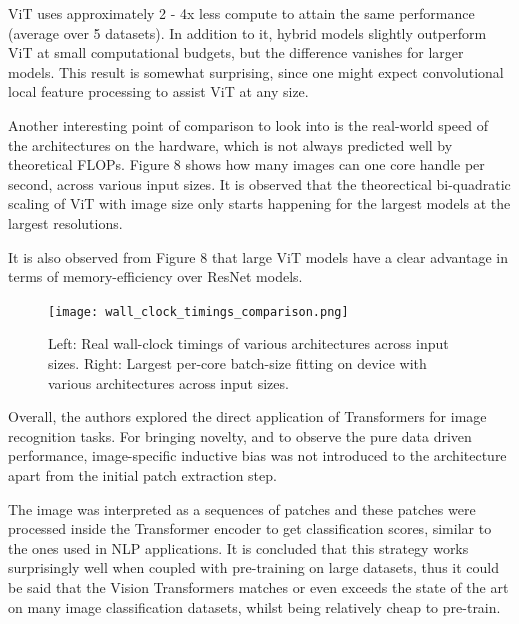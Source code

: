 \documentclass[conference]{IEEEtran}
\begin{document}
ViT uses approximately 2 - 4x less compute to attain the same performance (average over 5 datasets). In addition to it, hybrid models slightly outperform ViT at small computational budgets, but the difference vanishes for larger models. This result is somewhat surprising, since one might expect convolutional local feature processing to assist ViT at any size.




Another interesting point of comparison to look into is the real-world speed of the architectures on the hardware, which is not always predicted well by theoretical FLOPs.
Figure 8 shows how many images can one core handle per second, across various input sizes. It is observed that the theorectical bi-quadratic scaling of ViT with image size only starts happening for the largest models at the largest resolutions. 

It is also observed from Figure 8 that large ViT models have a clear advantage in terms of memory-efficiency over ResNet models.

\begin{figure}[htbp]
\centerline{\texttt{[image: wall\_clock\_timings\_comparison.png]}}
\caption{Left: Real wall-clock timings of various architectures across input sizes. Right: Largest per-core batch-size fitting on device with various architectures across input sizes.}

\end{figure}

Overall, the authors explored the direct application of Transformers for image recognition tasks. For bringing novelty, and to observe the pure data driven performance, image-specific inductive bias was not introduced to the architecture apart from the initial patch extraction step.

The image was interpreted as a sequences of patches and these patches were processed inside the Transformer encoder to get classification scores, similar to the ones used in NLP applications. It is concluded that this strategy works surprisingly well when coupled with pre-training on large datasets, thus it could be said that the Vision Transformers matches or even exceeds the state of the art on many image classification datasets, whilst being relatively cheap to pre-train.
\end{document}
